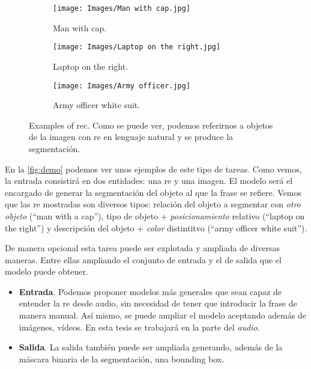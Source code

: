 \begin{figure}[ht]
  \centering
  \begin{subfigure}[t]{.32\textwidth}
    \centering
    \caption{Man with cap.}
    \texttt{[image: Images/Man with cap.jpg]}
  \end{subfigure}\hfill
  \begin{subfigure}[t]{.32\textwidth}
    \centering
    \caption{Laptop on the right.}
    \texttt{[image: Images/Laptop on the right.jpg]}
  \end{subfigure}\hfill
  \begin{subfigure}[t]{.32\textwidth}
    \centering
    \caption{Army officer white suit.}
    \texttt{[image: Images/Army officer.jpg]}
  \end{subfigure}
  \caption[Examples of \acl*{rec}]{Examples of \acl{rec}. Como se puede ver,
    podemos referirnos a objetos de la imagen con \gls{re} en lenguaje natural
    y se produce la segmentación.}
  \label{fig:demo}
\end{figure}

En la \vref{fig:demo} podemos ver unos ejemplos de este tipo de tareas. Como
vemos, la entrada consistirá en dos entidades: una \gls{re} y una imagen. El
modelo será el encargado de generar la segmentación del objeto al que la frase
se refiere. Vemos que las \gls{re} mostradas son diversos tipos: relación del
objeto a segmentar con \emph{otro objeto} (``man with a cap''), tipo de objeto
+ \emph{posicionamiento} relativo (``laptop on the right'') y descripción del
objeto + \emph{color} distintitvo (``army officer white suit'').

De manera opcional esta tarea puede ser explotada y ampliada de diversas
maneras. Entre ellas ampliando el conjunto de entrada y el de salida que el
modelo puede obtener.
\begin{itemize}
  \item \textbf{Entrada}. Podemos proponer modelos más generales que sean capaz
  de entender la \gls{re} desde audio, sin necesidad de tener que introducir la
  frase de manera manual. Así mismo, se puede ampliar el modelo aceptando
  además de imágenes, vídeos. En esta tesis se trabajará en la parte del
  \emph{audio}.
  \item \textbf{Salida}. La salida también puede ser ampliada generando, además
  de la máscara binaria de la segmentación, una bounding box.
\end{itemize}

